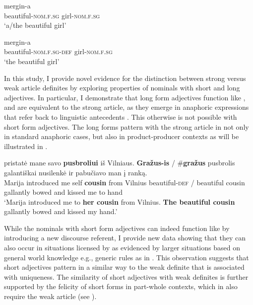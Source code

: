 \documentclass[output=paper,
modfonts
]{langscibook}
\begin{document}
\begin{exe}
\ex \label{ex:sereikaite:1} 
\begin{xlist}
\ex 
{} {mergin-a} \\
beautiful-\textsc{nom.f.sg}  girl-\textsc{nom.f.sg}\\
\trans `a/the beautiful girl'  \label{ex:sereikaite:1a} 

\ex 
{} {mergin-a}\\
beautiful-\textsc{nom.f.sg}-{\textsc{def}} girl-\textsc{nom.f.sg}\\
\trans `the beautiful girl' \label{ex:sereikaite:1b}
\end{xlist}
\end{exe}

In this study, I provide novel evidence for the distinction between strong versus weak article definites \citep{Schwarz2009} by exploring  properties of  nominals with short and long adjectives. In particular, I demonstrate that long form adjectives function like , and are equivalent to the  strong article, as they emerge in anaphoric expressions that refer back to linguistic antecedents . This  otherwise is not possible with short form adjectives. The long forms pattern with the strong article in  not only in standard anaphoric cases, but also in product-producer  contexts as will be illustrated in . \newpage

\begin{exe}
\ex\label{ex:sereikaite:2} 
 {pristatė} {mane} {savo} \textbf{pusbroliui} {iš} {Vilniaus}. \textbf{Gražus-is} \textnormal{/} \textnormal{\#}\textbf{gražus} {pusbrolis} {galantiškai} {nusilenkė} {ir} {pabučiavo} {man} {į} {ranką}.\\
Marija introduced me self \textbf{cousin} from Vilnius {beautiful-\textsc{def}} / {\phantom{\#}beautiful} cousin gallantly bowed and kissed me to hand \\
\trans `Marija introduced me to \textbf{her cousin} from Vilnius. \textbf{The beautiful cousin} gallantly bowed and kissed my hand.'
\end{exe}


While the nominals with short form adjectives can indeed function like  by introducing a new discourse referent, I provide new data showing that they can also occur in situations licensed by  as evidenced by larger situations based on general world knowledge e.g., generic rules as in . This observation suggests that short adjectives pattern in a similar way to the weak definite that is associated with uniqueness. 
The similarity of short adjectives with weak definites is further supported by the felicity of short forms in part-whole  contexts, which in  also require the weak article (see ). 
\end{document}
